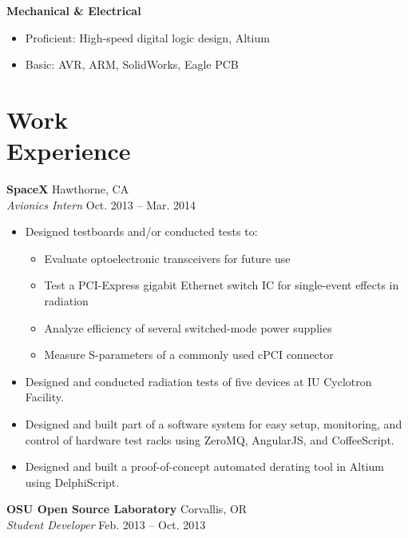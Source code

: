 \documentclass[10pt,letterpaper,margin]{res}
\begin{document}
\begin{resume}
{\bf Mechanical \& Electrical}\vspace{0.2em}

\begin{itemize}
	\item Proficient: High-speed digital logic design, Altium
	\item Basic: \hspace{17pt} AVR, ARM, SolidWorks, Eagle PCB
\end{itemize}



\section{Work \\ Experience}

{\bf SpaceX} \hfill {\color{lightgray} Hawthorne, CA} \\
{\it Avionics Intern} \hfill {\color{lightgray} Oct. 2013 -- Mar. 2014}\vspace{0.2em}

\begin{itemize}
	\item Designed testboards and/or conducted tests to:
		\begin{itemize}
			\item Evaluate optoelectronic transceivers for future use
			\item Test a PCI-Express gigabit Ethernet switch IC for
				single-event effects in radiation
			\item Analyze efficiency of several switched-mode power supplies
			\item Measure S-parameters of a commonly used cPCI connector
		\end{itemize}
	\item Designed and conducted radiation tests of five devices at IU
		Cyclotron Facility.
	\item Designed and built part of a software system for easy setup,
		monitoring, and control of hardware test racks using ZeroMQ, AngularJS,
		and CoffeeScript.
	\item Designed and built a proof-of-concept automated derating tool in
		Altium using DelphiScript.
\end{itemize}


{\bf OSU Open Source Laboratory} \hfill {\color{lightgray} Corvallis, OR} \\
{\it Student Developer} \hfill {\color{lightgray} Feb. 2013 -- Oct. 2013}\vspace{0.2em}


\end{resume}
\end{document}
